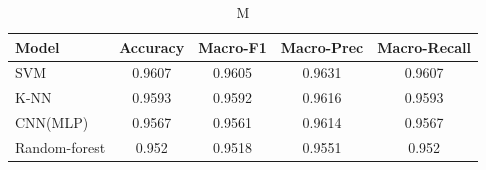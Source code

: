 \begin{table}[h!]
\centering
\caption{M}
\begin{tabular}{lcccc}
\toprule
\textbf{Model} & \textbf{Accuracy} & \textbf{Macro-F1} & \textbf{Macro-Prec} & \textbf{Macro-Recall} \\
\midrule
SVM&0.9607&0.9605&0.9631&0.9607\\ 
K-NN&0.9593&0.9592&0.9616&0.9593\\ 
CNN(MLP)&0.9567&0.9561&0.9614&0.9567\\ 
Random-forest&0.952&0.9518&0.9551&0.952\\ 
\bottomrule
\end{tabular}
\label{tab:M}
\end{table}
